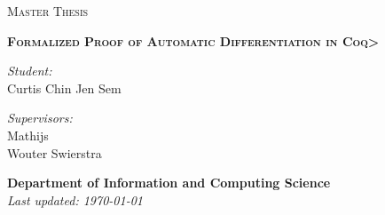 \begin{titlepage}

    \begin{figure}
       \begin{minipage}{0.48\textwidth}
       \begin{flushleft}
       \end{flushleft}
       \end{minipage}\hfill
       \begin{minipage}{0.48\textwidth}
       \begin{flushright}
       \end{flushright}
       \end{minipage}
    \end{figure}

    \thispagestyle{fancy}

    \vspace{1in}

    \center

    \textsc{\large Master Thesis}

    \vspace{0.5in}

    \noindent\makebox[\linewidth]{\rule{\linewidth}{1.2pt}}
    \textsc{\textbf{\large Formalized Proof of Automatic Differentiation in \<Coq>}}
    \noindent\makebox[\linewidth]{\rule{\linewidth}{1.2pt}}

    \vspace{0.5in}

    \begin{minipage}{0.48\textwidth}
        \begin{flushleft}
            \textit{Student:} \\
            Curtis Chin Jen Sem \\
        \end{flushleft}
    \end{minipage}
    \begin{minipage}{0.48\textwidth}
        \begin{flushright}
        \textit{Supervisors:} \\
        Mathijs \Vakar{} \\
        Wouter Swierstra \\
        \end{flushright}
    \end{minipage}

    \vspace{2in}

    \textbf{\large Department of Information and Computing Science} \\
    \textit{Last updated: \today}
\end{titlepage}
